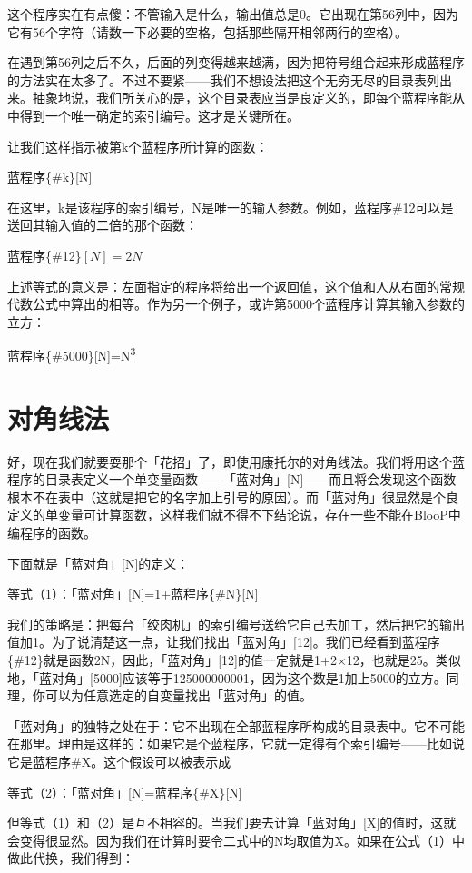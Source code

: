 \documentclass[
  12pt,
  twoside,
  openright,
  oldfontcommands,
]{memoir}
\begin{document}
这个程序实在有点傻：不管输入是什么，输出值总是0。它出现在第56列中，因为它有56个字符（请数一下必要的空格，包括那些隔开相邻两行的空格）。

在遇到第56列之后不久，后面的列变得越来越满，因为把符号组合起来形成蓝程序的方法实在太多了。不过不要紧------我们不想设法把这个无穷无尽的目录表列出来。抽象地说，我们所关心的是，这个目录表应当是良定义的，即每个蓝程序能从中得到一个唯一确定的索引编号。这才是关键所在。

让我们这样指示被第k个蓝程序所计算的函数：

蓝程序\{\#k\}{[}N{]}

在这里，k是该程序的索引编号，N是唯一的输入参数。例如，蓝程序\#12可以是送回其输入值的二倍的那个函数：

蓝程序\{\#12\}$[N]=2N$

上述等式的意义是：左面指定的程序将给出一个返回值，这个值和人从右面的常规代数公式中算出的相等。作为另一个例子，或许第5000个蓝程序计算其输入参数的立方：

蓝程序\{\#5000\}{[}N{]}=N\hyperref[fn:Chapter13-3]{\textsuperscript{3}}

\section{对角线法}

好，现在我们就要耍那个「花招」了，即使用康托尔的对角线法。我们将用这个蓝程序的目录表定义一个单变量函数------「蓝对角」{[}N{]}------而且将会发现这个函数根本不在表中（这就是把它的名字加上引号的原因）。而「蓝对角」很显然是个良定义的单变量可计算函数，这样我们就不得不下结论说，存在一些不能在BlooP中编程序的函数。

下面就是「蓝对角」{[}N{]}的定义：

等式（1）：「蓝对角」{[}N{]}=1+蓝程序\{\#N\}{[}N{]}

我们的策略是：把每台「绞肉机」的索引编号送给它自己去加工，然后把它的输出值加1。为了说清楚这一点，让我们找出「蓝对角」{[}12{]}。我们已经看到蓝程序\{\#12\}就是函数2N，因此，「蓝对角」{[}12{]}的值一定就是1+2×12，也就是25。类似地，「蓝对角」{[}5000{]}应该等于125000000001，因为这个数是1加上5000的立方。同理，你可以为任意选定的自变量找出「蓝对角」的值。

「蓝对角」的独特之处在于：它不出现在全部蓝程序所构成的目录表中。它不可能在那里。理由是这样的：如果它是个蓝程序，它就一定得有个索引编号------比如说它是蓝程序\#X。这个假设可以被表示成

等式（2）：「蓝对角」{[}N{]}=蓝程序\{\#X\}{[}N{]}

但等式（1）和（2）是互不相容的。当我们要去计算「蓝对角」{[}X{]}的值时，这就会变得很显然。因为我们在计算时要令二式中的N均取值为X。如果在公式（1）中做此代换，我们得到：
\end{document}
